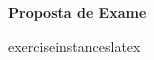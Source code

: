 \documentclass[a4paper]{article}
\begin{document}
\textbf{Proposta de Exame}


{{exerciseinstanceslatex}}
\end{document}
